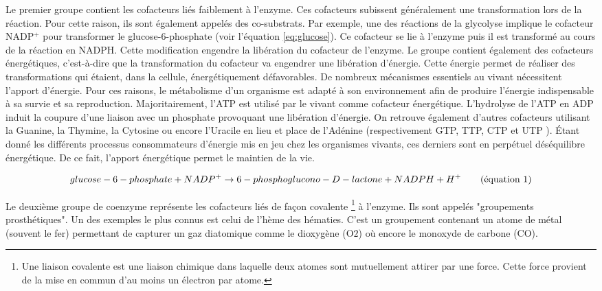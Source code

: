 \begin{refsegment}
    Le premier groupe contient les cofacteurs liés faiblement à l'enzyme. Ces cofacteurs subissent généralement une transformation lors de la réaction. Pour cette raison, ils sont également appelés des co-substrats. Par exemple, une des réactions de la glycolyse implique le cofacteur NADP$^{+}$ pour transformer le glucose-6-phosphate (voir l'équation \ref{eq:glucose}). Ce cofacteur  se lie à l'enzyme puis il est transformé au cours de la réaction en NADPH. Cette modification engendre la libération du cofacteur de l'enzyme. Le groupe contient également des cofacteurs énergétiques, c'est-à-dire que la transformation du cofacteur va engendrer une libération d'énergie. Cette énergie permet de réaliser des transformations qui étaient, dans la cellule, énergétiquement défavorables. De nombreux mécanismes essentiels au vivant nécessitent l'apport d'énergie. Pour ces raisons, le métabolisme d'un organisme est adapté à son environnement afin de produire l'énergie indispensable à sa survie et sa reproduction. Majoritairement, l'\acrfull{ATP} est utilisé par le vivant comme cofacteur énergétique. L'hydrolyse de l'\acrfull{ATP} en \acrfull{ADP} induit la coupure d'une liaison avec un phosphate provoquant une libération d'énergie. On retrouve également d'autres cofacteurs utilisant la Guanine, la Thymine, la Cytosine ou encore l'Uracile en lieu et place de l'Adénine (respectivement  GTP, TTP, CTP et UTP ). Étant donné les différents processus consommateurs d'énergie mis en jeu chez les organismes vivants, ces derniers sont en perpétuel déséquilibre énergétique. De ce fait, l'apport énergétique permet le maintien de la vie.
    
    \begin{equation}\label{eq:glucose}
        glucose-6-phosphate + NADP^{+} \rightarrow 6-phosphoglucono-D-lactone + NADPH + H^{+}
        \stepcounter{equation}\tag{équation \theequation}
    \end{equation}
    
    Le deuxième groupe de coenzyme représente les cofacteurs liés de façon covalente \footnote{Une liaison covalente est une liaison chimique dans laquelle deux atomes sont mutuellement attirer par une force. Cette force provient de la mise en commun d'au moins un électron par atome.} à l'enzyme. Ils sont appelés "groupements prosthétiques". Un des exemples le plus connus est celui de l'hème des hématies. C'est un groupement contenant un atome de métal (souvent le fer) permettant de capturer un gaz diatomique comme le dioxygène (O${2}$) où encore le monoxyde de carbone (CO).
    

\end{refsegment}
